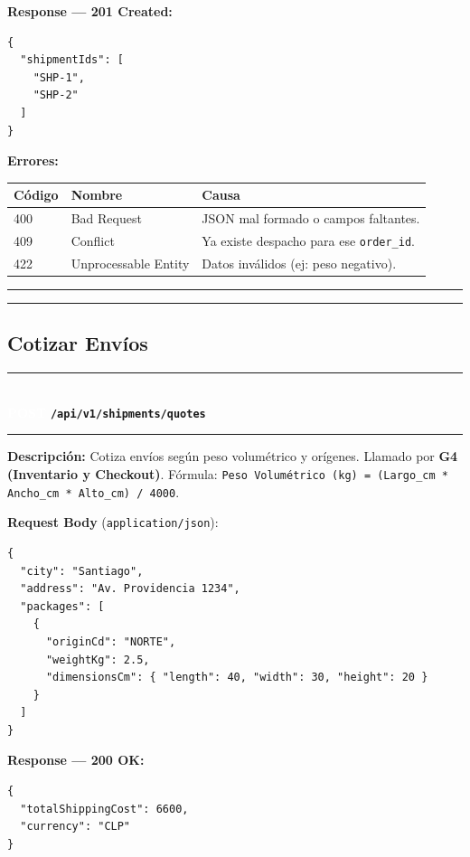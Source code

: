 \documentclass[11pt, a4paper]{article}
\newcommand{\httpmethod}[2]{%
  \colorbox{#1}{\textcolor{white}{\textbf{\small\textsf{#2}}}}%
}
\newcommand{\routeheader}[3]{%
  \noindent\rule{\textwidth}{1.5pt}\\[0.3em]
  \httpmethod{#1}{#2}\;\texttt{\bfseries #3}\\[0.3em]
  \rule{\textwidth}{0.4pt}
  \vspace{0.3cm}
}
\begin{document}
\textbf{Response --- 201 Created:}

\begin{lstlisting}
{
  "shipmentIds": [
    "SHP-1",
    "SHP-2"
  ]
}
\end{lstlisting}

\textbf{Errores:}
\begin{table}[h!]
\small
\begin{tabularx}{\textwidth}{l l X}
  \toprule
  \textbf{Código} & \textbf{Nombre} & \textbf{Causa} \\
  \midrule
  400 & Bad Request          & JSON mal formado o campos faltantes. \\
  409 & Conflict             & Ya existe despacho para ese \texttt{order\_id}. \\
  422 & Unprocessable Entity & Datos inválidos (ej: peso negativo). \\
  \bottomrule
\end{tabularx}
\end{table}

\noindent\rule{\textwidth}{0.4pt}


\noindent\rule{\textwidth}{0.4pt}

\subsection{Cotizar Envíos}

\routeheader{post}{POST}{/api/v1/shipments/quotes}

\textbf{Descripción:} Cotiza envíos según peso volumétrico y orígenes. Llamado por \textbf{G4 (Inventario y Checkout)}.
Fórmula: \texttt{Peso Volumétrico (kg) = (Largo\_cm * Ancho\_cm * Alto\_cm) / 4000}.

\vspace{0.3cm}
\textbf{Request Body} (\texttt{application/json}):

\begin{lstlisting}
{
  "city": "Santiago",
  "address": "Av. Providencia 1234",
  "packages": [
    {
      "originCd": "NORTE",
      "weightKg": 2.5,
      "dimensionsCm": { "length": 40, "width": 30, "height": 20 }
    }
  ]
}
\end{lstlisting}

\textbf{Response --- 200 OK:}

\begin{lstlisting}
{
  "totalShippingCost": 6600,
  "currency": "CLP"
}
\end{lstlisting}
\end{document}
